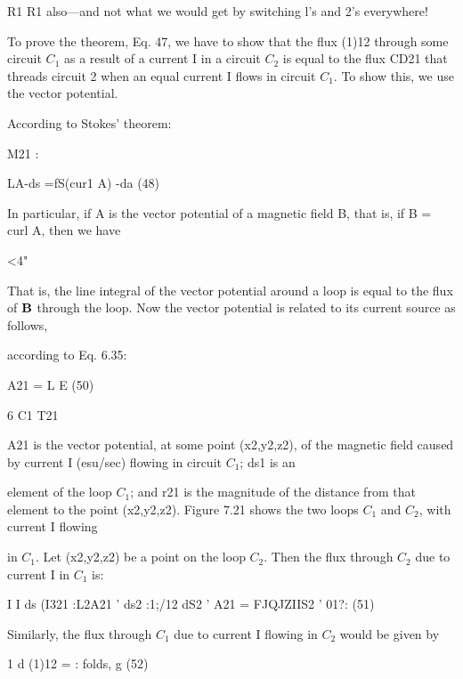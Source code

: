 R1 R1
also---and not what we would get by switching l's and 2's everywhere!

To prove the theorem, Eq. 47, we have to show that the flux (1)12
through some circuit $C_1$ as a result of a current I in a circuit $C_2$ is
equal to the flux CD21 that threads circuit 2 when an equal current I
flows in circuit $C_1$. To show this, we use the vector potential.

According to Stokes' theorem:

\begin{equation}
\end{equation}
M21 :

LA-ds =fS(cur1 A) -da (48)

In particular, if A is the vector potential of a magnetic field B, that is,
if B = curl A, then we have

\begin{equation}
\end{equation}
<4"

That is, the line integral of the vector potential around a loop is equal
to the flux of $\mathbf{B}$ through the loop.
Now the vector potential is related to its current source as follows,

according to Eq. 6.35:

\begin{equation}
\end{equation}
A21 = L E (50)

6 C1 T21

A21 is the vector potential, at some point (x2,y2,z2), of the magnetic
field caused by current I (esu/sec) flowing in circuit $C_1$; ds1 is an

element of the loop $C_1$; and r21 is the magnitude of the distance from
that element to the point (x2,y2,z2).
Figure 7.21 shows the two loops $C_1$ and $C_2$, with current I flowing

in $C_1$. Let (x2,y2,z2) be a point on the loop $C_2$. Then the flux
through $C_2$ due to current I in $C_1$ is:

\begin{equation}
\end{equation}
I I ds
(I321 :L2A21 ' ds2 :1;/12 dS2 ' A21 = FJQJZIIS2 ' 01?: (51)

Similarly, the flux through $C_1$ due to current I flowing in $C_2$ would
be given by

\begin{equation}
\end{equation}
1 d
(1)12 = : folds, g (52)

